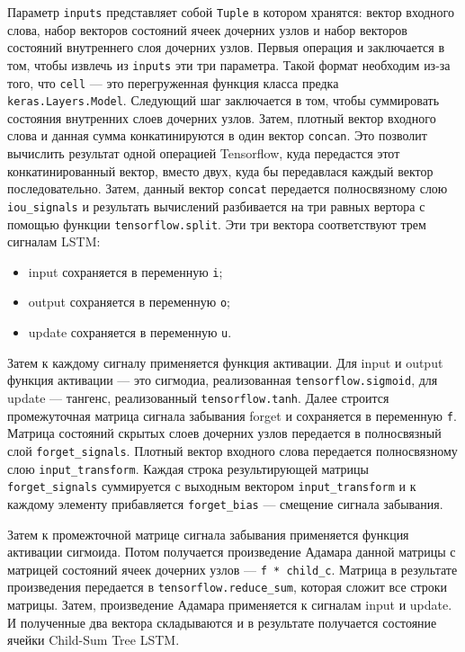 Параметр \texttt{inputs} представляет собой \texttt{Tuple} в котором хранятся: вектор входного слова, набор векторов состояний ячеек дочерних узлов и набор векторов состояний внутреннего слоя дочерних узлов. Первыя операция и заключается в том, чтобы извлечь из \texttt{inputs} эти три параметра. Такой формат необходим из-за того, что \texttt{cell} --- это перегруженная функция класса предка \texttt{keras.Layers.Model}. Следующий шаг заключается в том, чтобы суммировать состояния внутренних слоев дочерних узлов. Затем, плотный вектор входного слова и данная сумма конкатинируются в один вектор \texttt{concan}. Это позволит вычислить результат одной операцией Tensorflow, куда передастся этот конкатинированный вектор, вместо двух, куда бы передавлася каждый вектор последовательно. Затем, данный вектор \texttt{concat} передается полносвязному слою \texttt{iou\_signals} и результать вычислений разбивается на три равных вертора с помощью функции \texttt{tensorflow.split}. Эти три вектора соответствуют трем сигналам LSTM\@:
\begin{itemize}
\item input сохраняется в переменную \texttt{i};
\item output сохраняется в переменную \texttt{o};
\item update сохраняется в переменную \texttt{u}.
\end{itemize}

Затем к каждому сигналу применяется функция активации. Для input и output функция активации --- это сигмодиа, реализованная \texttt{tensorflow.sigmoid}, для update --- тангенс, реализованный \texttt{tensorflow.tanh}. Далее строится промежуточная матрица сигнала забывания forget и сохраняется в переменную \texttt{f}. Матрица состояний скрытых слоев дочерних узлов передается в полносвязный слой \texttt{forget\_signals}. Плотный вектор входного слова передается полносвязному слою \texttt{input\_transform}. Каждая строка результирующей матрицы \texttt{forget\_signals} суммируется с выходным вектором \texttt{input\_transform} и к каждому элементу прибавляется \texttt{forget\_bias} --- смещение сигнала забывания.

Затем к промежточной матрице сигнала забывания применяется функция активации сигмоида. Потом получается произведение Адамара данной матрицы с матрицей состояний ячеек дочерних узлов --- \texttt{f * child\_c}. Матрица в результате произведения передается в \texttt{tensorflow.reduce\_sum}, которая сложит все строки матрицы. Затем, произведение Адамара применяется к сигналам input и update. И полученные два вектора складываются и в результате получается состояние ячейки Child-Sum Tree LSTM\@.

